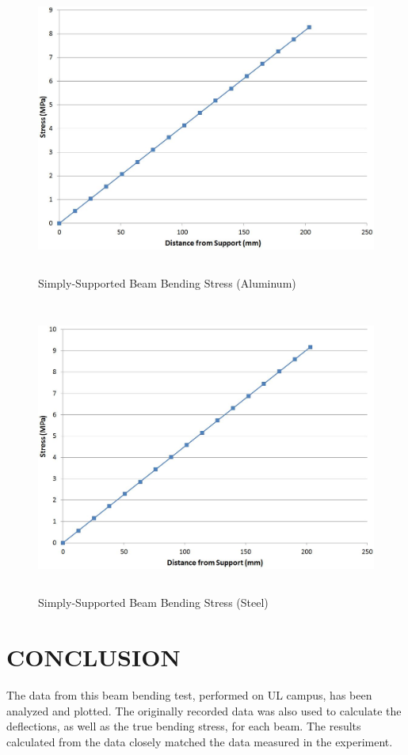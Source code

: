 \documentclass[12pt]{article}
\begin{document}
\begin{figure}[h!]  
  \centering
    \includegraphics[width=\linewidth, height=3.8in]{simp_support_a_stress_vs_distance.JPG}
    \caption{Simply-Supported Beam Bending Stress (Aluminum)} 
\end{figure}

\bigskip

\begin{figure}[h!]  
  \centering
    \includegraphics[width=\linewidth, height=3.8in]{simp_support_s_stress_vs_distance.JPG}
    \caption{Simply-Supported Beam Bending Stress (Steel)} 
\end{figure}


\newpage


\section*{\fontsize{12}{12}\selectfont CONCLUSION}
The data from this beam bending test, performed on UL campus, has been analyzed and plotted. The originally recorded data was also used to calculate the deflections, as well as the true bending stress, for each beam. The results calculated from the data closely matched the data measured in the experiment. 
\bigskip
\end{document}
